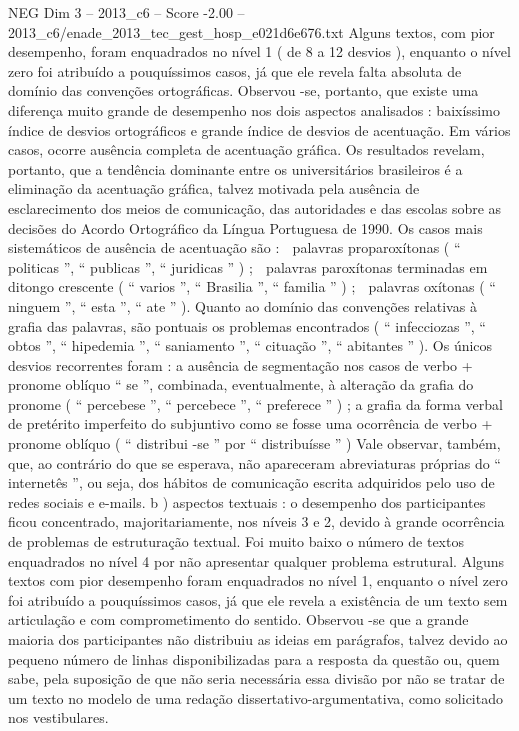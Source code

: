 \begin{textsample}{NEG Dim 3 – 2013\_c6 – Score -2.00 – 2013\_c6/enade\_2013\_tec\_gest\_hosp\_e021d6e676.txt}
Alguns textos, com pior desempenho, foram enquadrados no nível 1 ( de 8 a 12 desvios ), enquanto o nível zero foi atribuído a pouquíssimos casos, já que ele revela falta absoluta de domínio das convenções ortográficas.
Observou -se, portanto, que existe uma diferença muito grande de desempenho nos dois aspectos analisados : baixíssimo índice de desvios ortográficos e grande índice de desvios de acentuação.
Em vários casos, ocorre ausência completa de acentuação gráfica.
Os resultados revelam, portanto, que a tendência dominante entre os universitários brasileiros é a eliminação da acentuação gráfica, talvez motivada pela ausência de esclarecimento dos meios de comunicação, das autoridades e das escolas sobre as decisões do Acordo Ortográfico da Língua Portuguesa de 1990.
Os casos mais sistemáticos de ausência de acentuação são :  palavras proparoxítonas ( “ politicas ”, “ publicas ”, “ juridicas ” ) ;  palavras paroxítonas terminadas em ditongo crescente ( “ varios ”, “ Brasilia ”, “ familia ” ) ;  palavras oxítonas ( “ ninguem ”, “ esta ”, “ ate ” ).
Quanto ao domínio das convenções relativas à grafia das palavras, são pontuais os problemas encontrados ( “ infecciozas ”, “ obtos ”, “ hipedemia ”, “ saniamento ”, “ cituação ”, “ abitantes ” ).
Os únicos desvios recorrentes foram : a ausência de segmentação nos casos de verbo + pronome oblíquo “ se ”, combinada, eventualmente, à alteração da grafia do pronome ( “ percebese ”, “ percebece ”, “ preferece ” ) ; a grafia da forma verbal de pretérito imperfeito do subjuntivo como se fosse uma ocorrência de verbo + pronome oblíquo ( “ distribui -se ” por “ distribuísse ” ) Vale observar, também, que, ao contrário do que se esperava, não apareceram abreviaturas próprias do “ internetês ”, ou seja, dos hábitos de comunicação escrita adquiridos pelo uso de redes sociais e e-mails. b ) aspectos textuais : o desempenho dos participantes ficou concentrado, majoritariamente, nos níveis 3 e 2, devido à grande ocorrência de problemas de estruturação textual.
Foi muito baixo o número de textos enquadrados no nível 4 por não apresentar qualquer problema estrutural.
Alguns textos com pior desempenho foram enquadrados no nível 1, enquanto o nível zero foi atribuído a pouquíssimos casos, já que ele revela a existência de um texto sem articulação e com comprometimento do sentido.
Observou -se que a grande maioria dos participantes não distribuiu as ideias em parágrafos, talvez devido ao pequeno número de linhas disponibilizadas para a resposta da questão ou, quem sabe, pela suposição de que não seria necessária essa divisão por não se tratar de um texto no modelo de uma redação dissertativo-argumentativa, como solicitado nos vestibulares.

\end{textsample}
